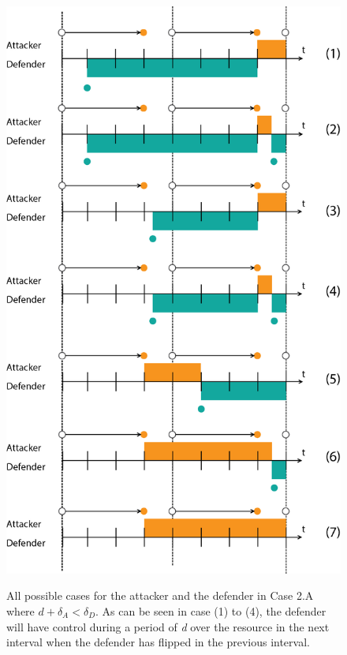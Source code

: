 \begin{figure}[hbtp]
\caption{All possible cases for the attacker and the defender in Case 2.A where $d + \delta_{A} < \delta_{D}$. As can be seen in case (1) to (4), the defender will have control during a period of \textit{d} over the resource in the next interval when the defender has flipped in the previous interval.}
\centering
\includegraphics[scale=0.7]{../../doc/template/Images/FlipItCase2a.png}
\label{fig:case2}
\end{figure}


